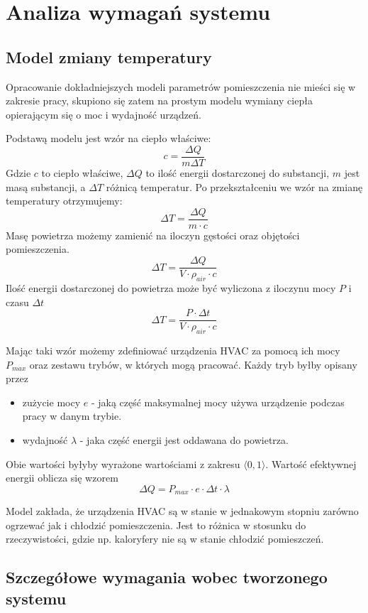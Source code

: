 \chapter{Analiza wymagań systemu}

\section{Model zmiany temperatury}
Opracowanie dokładniejszych modeli parametrów pomieszczenia nie mieści się w zakresie pracy, skupiono się zatem na prostym modelu wymiany ciepła opierającym się o moc i wydajność urządzeń.

Podstawą modelu jest wzór na ciepło właściwe:
$$ c = \frac{\Delta Q}{m \Delta T} $$
Gdzie $c$ to ciepło właściwe, $\Delta Q$ to ilość energii dostarczonej do substancji, $m$ jest masą substancji, a $\Delta T$ różnicą temperatur.
Po przekształceniu we wzór na zmianę temperatury otrzymujemy:
$$ \Delta T = \frac{\Delta Q}{m \cdot c} $$
Masę powietrza możemy zamienić na iloczyn gęstości oraz objętości pomieszczenia.
$$ \Delta T = \frac{\Delta Q}{V \cdot \rho_{air} \cdot c} $$
Ilość energii dostarczonej do powietrza może być wyliczona z iloczynu mocy $P$ i czasu $\Delta t$
$$ \Delta T = \frac{P \cdot \Delta t}{V \cdot \rho_{air} \cdot c} $$

Mając taki wzór możemy zdefiniować urządzenia HVAC za pomocą ich mocy $P_{max}$ oraz zestawu trybów, w których mogą pracować.
Każdy tryb byłby opisany przez 
\begin{itemize}
    \item zużycie mocy $e$ - jaką część maksymalnej mocy używa urządzenie podczas pracy w danym trybie. 
    \item wydajność $\lambda$ - jaka część energii jest oddawana do powietrza. 
\end{itemize}
Obie wartości byłyby wyrażone wartościami z zakresu $\langle 0,1 \rangle$. Wartość efektywnej energii oblicza się wzorem
$$ \Delta Q = P_{max} \cdot e \cdot \Delta t \cdot \lambda $$

Model zakłada, że urządzenia HVAC są w stanie w jednakowym stopniu zarówno ogrzewać jak i chłodzić pomieszczenia. Jest to różnica w stosunku do rzeczywistości, gdzie np. kaloryfery nie są w stanie chłodzić pomieszczeń.

\section{Szczegółowe wymagania wobec tworzonego systemu} \label{sec:wymagania}
